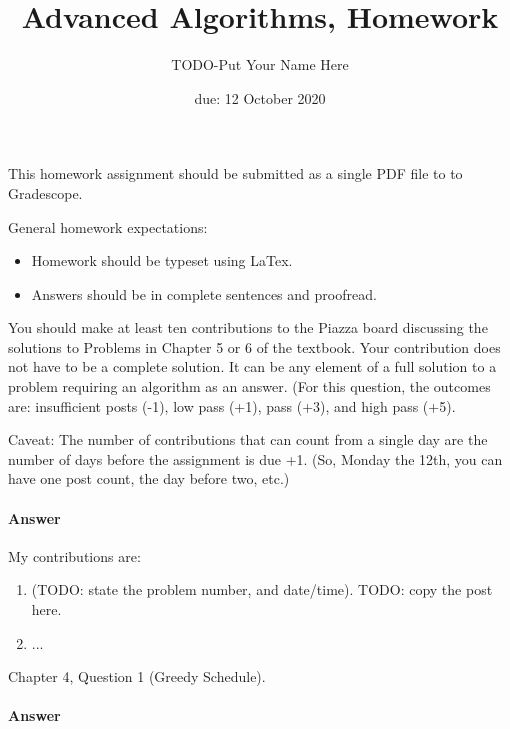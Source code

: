 \documentclass{article}
\title{Advanced Algorithms, Homework \hwnum}
\author{TODO-Put Your Name Here}
\date{due: 12 October 2020}
\begin{document}
\maketitle

This homework assignment should be
submitted as a single PDF file to to Gradescope.

General homework expectations:
\begin{itemize}
    \item Homework should be typeset using LaTex.
    \item Answers should be in complete sentences and proofread.
\end{itemize}

\nextprob
{}

You should make at least ten contributions to the Piazza board
discussing the solutions to Problems in Chapter 5 or 6 of the textbook.  Your
contribution does not have to be a complete solution.  It can be any element of
a full solution to a problem requiring an algorithm as an answer.  (For this
question, the outcomes are: insufficient posts (-1), low pass (+1), pass (+3),
and high pass (+5).

Caveat: The number of contributions that can count from a single day are the
number of days before the assignment is due +1.  (So, Monday the 12th, you can
have one post count, the day before two, etc.)

\paragraph{Answer}


My contributions are:
\begin{enumerate}
    \item (TODO: state the problem number, and date/time). TODO:
        copy the post here.
    \item ...
\end{enumerate}


\nextprob
{}

Chapter 4, Question 1 (Greedy Schedule).

\paragraph{Answer}
\end{document}
